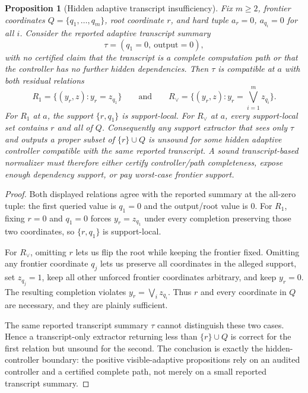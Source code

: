 \documentclass[11pt]{article}
\newtheorem{proposition}[theorem]{Proposition}
\theoremstyle{definition}
\begin{document}
\begin{proposition}[Hidden adaptive transcript insufficiency]\label{prop:hidden-adaptive-transcript-insufficiency}
Fix \(m\ge 2\), frontier coordinates \(Q=\{q_1,\ldots,q_m\}\), root coordinate \(r\), and hard tuple \(a_r=0\), \(a_{q_i}=0\) for all \(i\).  Consider the reported adaptive transcript summary
\[
  \tau=(q_1=0,\ \mathrm{output}=0),
\]
with no certified claim that the transcript is a complete computation path or that the controller has no further hidden dependencies.  Then \(\tau\) is compatible at \(a\) with both residual relations
\[
  R_1=\{(y_r,z):y_r=z_{q_1}\}
  \qquad\text{and}\qquad
  R_{\vee}=\{(y_r,z):y_r=\bigvee_{i=1}^m z_{q_i}\}.
\]
For \(R_1\) at \(a\), the support \(\{r,q_1\}\) is support-local.  For \(R_{\vee}\) at \(a\), every support-local set contains \(r\) and all of \(Q\).  Consequently any support extractor that sees only \(\tau\) and outputs a proper subset of \(\{r\}\cup Q\) is unsound for some hidden adaptive controller compatible with the same reported transcript.  A sound transcript-based normalizer must therefore either certify controller/path completeness, expose enough dependency support, or pay worst-case frontier support.
\end{proposition}

\begin{proof}
Both displayed relations agree with the reported summary at the all-zero tuple: the first queried value is \(q_1=0\) and the output/root value is \(0\).  For \(R_1\), fixing \(r=0\) and \(q_1=0\) forces \(y_r=z_{q_1}\) under every completion preserving those two coordinates, so \(\{r,q_1\}\) is support-local.

For \(R_{\vee}\), omitting \(r\) lets us flip the root while keeping the frontier fixed.  Omitting any frontier coordinate \(q_j\) lets us preserve all coordinates in the alleged support, set \(z_{q_j}=1\), keep all other unforced frontier coordinates arbitrary, and keep \(y_r=0\).  The resulting completion violates \(y_r=\bigvee_i z_{q_i}\).  Thus \(r\) and every coordinate in \(Q\) are necessary, and they are plainly sufficient.

The same reported transcript summary \(\tau\) cannot distinguish these two cases.  Hence a transcript-only extractor returning less than \(\{r\}\cup Q\) is correct for the first relation but unsound for the second.  The conclusion is exactly the hidden-controller boundary: the positive visible-adaptive propositions rely on an audited controller and a certified complete path, not merely on a small reported transcript summary.
\end{proof}
\end{document}
